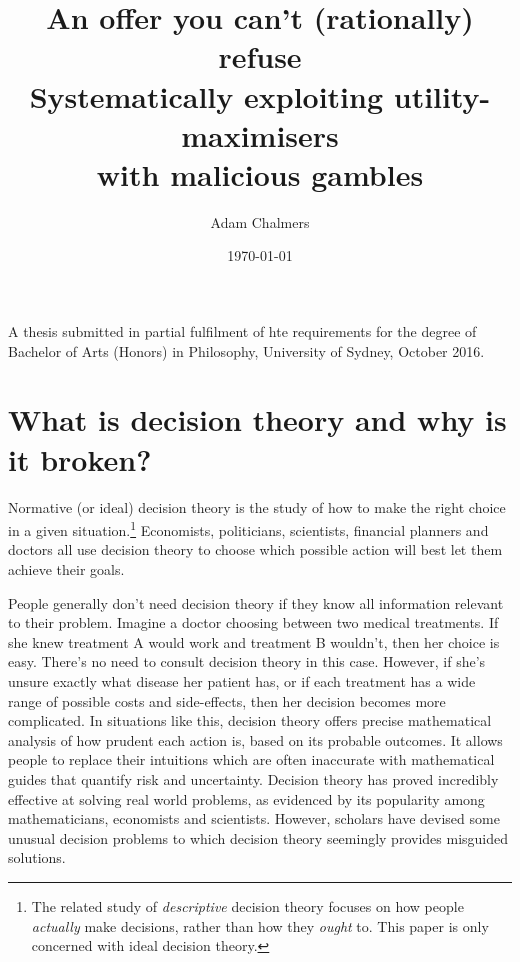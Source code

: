 \documentclass{article}
\title{%
  An offer you can't (rationally) refuse \\
  \large Systematically exploiting utility-maximisers \\
    with malicious gambles}
\author{Adam Chalmers}
\date{\today}
\begin{document}
\frenchspacing
\doublespacing
\maketitle

A thesis submitted in partial fulfilment of hte requirements for the degree of Bachelor of Arts (Honors) in Philosophy, University of Sydney, October 2016.

\newpage\tableofcontents

\newpage\section{What is decision theory and why is it broken?}

Normative (or ideal) decision theory is the study of how to make the right choice in a given situation.\footnote{The related study of \textit{descriptive} decision theory focuses on how people \textit{actually} make decisions, rather than how they \textit{ought} to. This paper is only concerned with ideal decision theory.} Economists, politicians, scientists, financial planners and doctors all use decision theory to choose which possible action will best let them achieve their goals.

People generally don't need decision theory if they know all information relevant to their problem. Imagine a doctor choosing between two medical treatments. If she knew treatment A would work and treatment B wouldn't, then her choice is easy. There's no need to consult decision theory in this case. However, if she's unsure exactly what disease her patient has, or if each treatment has a wide range of possible costs and side-effects, then her decision becomes more complicated. In situations like this, decision theory offers precise mathematical analysis of how prudent each action is, based on its probable outcomes. It allows people to replace their intuitions \textemdash{} which are often inaccurate \textemdash{} with mathematical guides that quantify risk and uncertainty. Decision theory has proved incredibly effective at solving real world problems, as evidenced by its popularity among mathematicians, economists and scientists. However, scholars have devised some unusual decision problems to which decision theory seemingly provides misguided solutions. 
\end{document}
